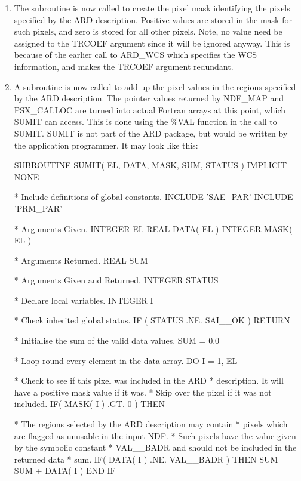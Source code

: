 \documentclass[11pt]{starlink}
\begin{document}
\begin{enumerate}
\item The subroutine  is now called to create
the pixel mask identifying the pixels specified by the ARD description.
Positive values are stored in the mask for such pixels, and zero is
stored for all other pixels. Note, no value need be assigned to the TRCOEF
argument since it will be ignored anyway. This is because of the earlier call
to ARD\_WCS which specifies the WCS information, and makes the TRCOEF
argument redundant.

\item A subroutine is now called to add up the pixel values in the regions
specified by the ARD description. The pointer values returned by NDF\_MAP and
PSX\_CALLOC are turned into actual Fortran arrays at this point, which SUMIT can
access. This is done using the \%VAL function in the call to SUMIT. SUMIT
is not part of the ARD package, but would be written by the application
programmer. It may look like this:

\small
\begin{terminalv}
      SUBROUTINE SUMIT( EL, DATA, MASK, SUM, STATUS )
      IMPLICIT NONE

*  Include definitions of global constants.
      INCLUDE 'SAE_PAR'
      INCLUDE 'PRM_PAR'

*  Arguments Given.
      INTEGER EL
      REAL DATA( EL )
      INTEGER MASK( EL )

*  Arguments Returned.
      REAL SUM

*  Arguments Given and Returned.
      INTEGER STATUS

*  Declare local variables.
      INTEGER I

*  Check inherited global status.
      IF ( STATUS .NE. SAI__OK ) RETURN

*  Initialise the sum of the valid data values.
      SUM = 0.0

*  Loop round every element in the data array.
      DO I = 1, EL

*  Check to see if this pixel was included in the ARD
*  description. It will have a positive mask value if it was.
*  Skip over the pixel if it was not included.
         IF( MASK( I ) .GT. 0 ) THEN

*  The regions selected by the ARD description may contain
*  pixels which are flagged as unusable in the input NDF.
*  Such pixels have the value given by the symbolic constant
*  VAL__BADR and should not be included in the returned data
*  sum.
            IF( DATA( I ) .NE. VAL__BADR ) THEN
               SUM = SUM + DATA( I )
            END IF


\end{terminalv}
\end{enumerate}
\end{document}
